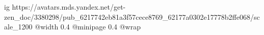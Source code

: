  
 
 
 
 

\ifcmt
  ig https://avatars.mds.yandex.net/get-zen_doc/3380298/pub_6217742eb81a3f57cece8769_62177a0302e17778b2ffe068/scale_1200
  @width 0.4
  @minipage 0.4
  @wrap \parpic[r]
\fi
